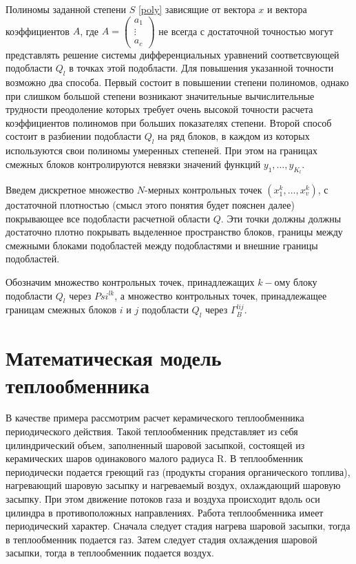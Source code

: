 \documentclass[a4paper,12pt]{article}
\begin{document}
Полиномы заданной степени $S$ \eqref{poly} зависящие от вектора $x$ и 
вектора коэффициентов $A$, где
$A=\left(\begin{matrix}a_1\\\vdots\\ a_c\end{matrix}\right)$
не всегда с достаточной точностью могут представлять решение системы 
дифференциальных уравнений соответсвующей подобласти $Q_l$ в точках
этой подобласти. Для повышения указанной точности возможно два способа.
Первый состоит в повышении степени полиномов, однако при слишком 
большой степени возникают значительные вычислительные трудности
преодоление которых требует очень высокой точности расчета
коэффициентов полиномов при больших показателях степени. Второй способ
состоит в разбиении подобласти $Q_l$ на ряд блоков, в каждом из которых
используются свои полиномы умеренных степеней. При этом на границах
смежных блоков контролируются невязки значений функций
$y_1,\ldots,y_{K_l}$.

Введем дискретное множество $N$-мерных контрольных точек
$(x^k_1,\ldots,x^k_v)$, с достаточной плотностью (смысл этого понятия 
будет пояснен далее) покрывающее все подобласти расчетной области $Q$. 
Эти точки должны должны достаточно плотно покрывать выделенное пространство
блоков, границы между смежными блоками подобластей между подобластями и
внешние границы подобластей. 

Обозначим множество контрольных точек, принадлежащих $k-ому$ блоку 
подобласти $Q_l$ через $Psi^{lk}$, а множество контрольных точек,
принадлежащее границам смежных блоков $i$ и $j$ подобласти $Q_l$ через
$\Gamma^{lij}_B$.

\section{Математическая модель теплообменника}

В качестве примера рассмотрим расчет керамического теплообменника
периодического действия. Такой теплообменник представляет из себя
цилиндрический объем, заполненный шаровой засыпкой, состоящей из
керамических шаров одинакового малого радиуса R. В теплообменник
периодически подается греющий газ (продукты сгорания органического
топлива), нагревающий шаровую засыпку и нагреваемый воздух, охлаждающий
шаровую засыпку. При этом движение потоков газа и воздуха происходит вдоль
оси цилиндра в противоположных направлениях. Работа теплообменника имеет
периодический характер. Сначала следует стадия нагрева шаровой засыпки,
тогда в теплообменник подается газ. Затем следует стадия охлаждения шаровой
засыпки, тогда в теплообменник подается воздух.
\end{document}
